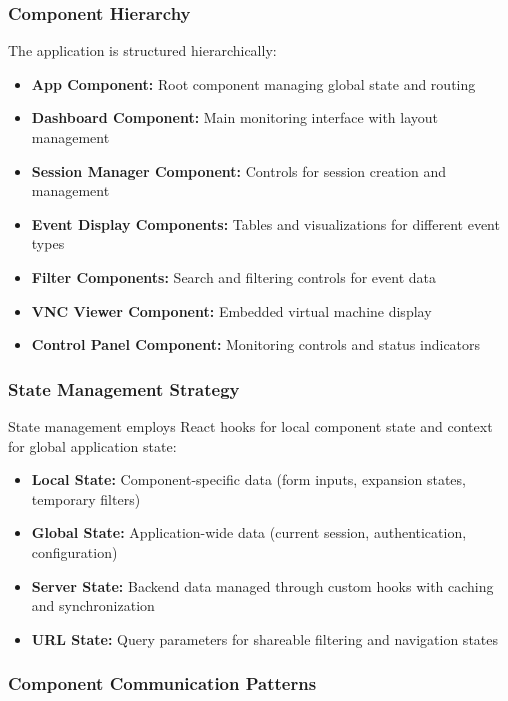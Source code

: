 \subsubsection{Component Hierarchy}

The application is structured hierarchically:

\begin{itemize}
    \item \textbf{App Component:} Root component managing global state and routing
    \item \textbf{Dashboard Component:} Main monitoring interface with layout management
    \item \textbf{Session Manager Component:} Controls for session creation and management
    \item \textbf{Event Display Components:} Tables and visualizations for different event types
    \item \textbf{Filter Components:} Search and filtering controls for event data
    \item \textbf{VNC Viewer Component:} Embedded virtual machine display
    \item \textbf{Control Panel Component:} Monitoring controls and status indicators
\end{itemize}

\subsubsection{State Management Strategy}

State management employs React hooks for local component state and context for global application state:

\begin{itemize}
    \item \textbf{Local State:} Component-specific data (form inputs, expansion states, temporary filters)
    \item \textbf{Global State:} Application-wide data (current session, authentication, configuration)
    \item \textbf{Server State:} Backend data managed through custom hooks with caching and synchronization
    \item \textbf{URL State:} Query parameters for shareable filtering and navigation states
\end{itemize}

\subsubsection{Component Communication Patterns}


